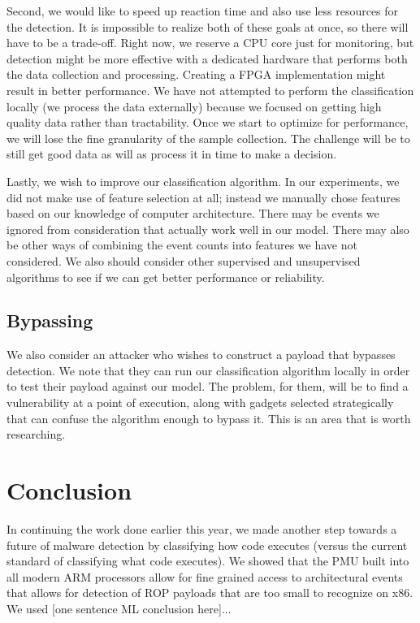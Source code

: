 \documentclass[letterpaper,twocolumn,10pt]{article}
\begin{document}
Second, we would like to speed up reaction time and also use less resources for the detection. It is impossible to realize both of these goals at once, so there will have to be a trade-off. Right now, we reserve a CPU core just for monitoring, but detection might be more effective with a dedicated hardware that performs both the data collection and processing. Creating a FPGA implementation might result in better performance. We have not attempted to perform the classification locally (we process the data externally) because we focused on getting high quality data rather than tractability. Once we start to optimize for performance, we will lose the fine granularity of the sample collection. The challenge will be to still get good data as will as process it in time to make a decision.

Lastly, we wish to improve our classification algorithm. In our experiments, we did not make use of feature selection at all; instead we manually chose features based on our knowledge of computer architecture. There may be events we ignored from consideration that actually work well in our model. There may also be other ways of combining the event counts into features we have not considered. We also should consider other supervised and unsupervised algorithms to see if we can get better performance or reliability.

\subsection*{Bypassing}

We also consider an attacker who wishes to construct a payload that bypasses detection. We note that they can run our classification algorithm locally in order to test their payload against our model. The problem, for them, will be to find a vulnerability at a point of execution, along with gadgets selected strategically that can confuse the algorithm enough to bypass it. This is an area that is worth researching.

\section{Conclusion}

In continuing the work done earlier this year, we made another step towards a future of malware detection by classifying how code executes (versus the current standard of classifying what code executes). We showed that the PMU built into all modern ARM processors allow for fine grained access to architectural events that allows for detection of ROP payloads that are too small to recognize on x86\cite{DBLP:journals/corr/TangSS14}. We used [one sentence ML conclusion here]...
\end{document}
